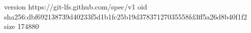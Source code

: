 version https://git-lfs.github.com/spec/v1
oid sha256:dbf692138739d40233f5d1b1fc25b19d37837127035558fd3ff5a26d8b40f1f2
size 174880
